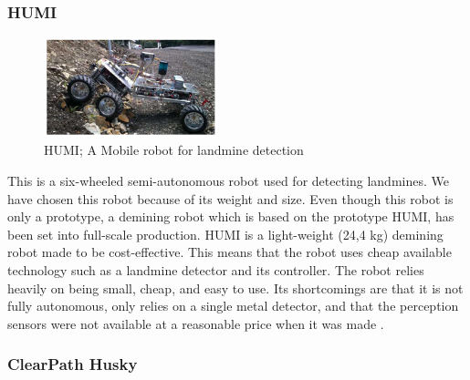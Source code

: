 \subsubsection*{HUMI}

\begin{figure}
    \centering
      \includegraphics[width=0.45\textwidth]{00 - Images/humi_a_mobile_robot_for_landmine_detection.png}
  \caption{HUMI; A Mobile robot for landmine detection \cite{HUMI2012}}
  \label{fig:humi_a_mobile_robot_for_landmine_detection}
\end{figure}
This is a six-wheeled semi-autonomous robot used for detecting landmines. We have chosen this robot because of its weight and size. Even though this robot is only a prototype, a demining robot which is based on the prototype HUMI, has been set into full-scale production. HUMI is a light-weight (24,4 kg) demining robot made to be cost-effective. This means that the robot uses cheap available technology such as a landmine detector and its controller. The robot relies heavily on being small, cheap, and easy to use. Its shortcomings are that it is not fully autonomous, only relies on a single metal detector, and that the perception sensors were not available at a reasonable price when it was made \cite{HUMI2012}.

\newpage

\subsubsection*{ClearPath Husky}

